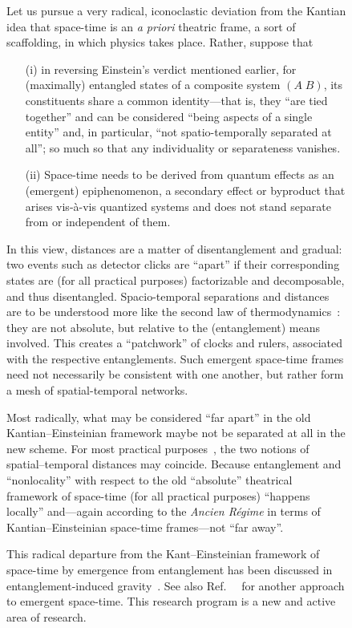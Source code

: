 \documentclass[entropy,article,accept,oneauthor,pdftex]{Definitions/mdpi}
\begin{document}
\begin{figure}[H]
Let us pursue a very radical, iconoclastic deviation from the Kantian idea
that space-time is an {\it a priori} theatric frame, a sort of scaffolding,
in which physics takes place. Rather, suppose that
\begin{itemize}
\item[(i)]
in reversing Einstein's verdict mentioned earlier,
for (maximally) entangled states of a composite system $(A\;B)$,
its constituents share a common identity---that is,
they ``are tied together'' and can be considered ``being aspects of a single entity'' and,
in particular, ``not spatio-temporally separated at all'';
so much so that any individuality or separateness vanishes.

\item[(ii)]
Space-time needs to be derived from quantum effects as an (emergent) epiphenomenon,
a secondary effect or byproduct that arises vis-\`a-vis quantized systems
and does not stand separate from or independent of them.
\end{itemize}

In this view, distances are a matter of disentanglement and gradual:
two events such as detector clicks are ``apart'' if their corresponding states
are (for all practical purposes) factorizable and decomposable, and thus disentangled.
Spacio-temporal separations and distances are to be understood more like the second law
of thermodynamics~\cite{Myrvold2011237}: they are not absolute, but relative
to the (entanglement) means involved.
This creates a ``patchwork'' of clocks and rulers, associated with the respective entanglements.
Such emergent space-time frames need not necessarily be consistent with one another,
but rather form a mesh of spatial-temporal networks.

Most radically, what may be considered ``far apart'' in the old Kantian--Einsteinian
framework maybe not be separated at all in the new scheme.
For most practical purposes~\cite{bell:a1,bell-a},
the two notions of spatial--temporal distances may coincide.
Because entanglement and ``nonlocality'' with respect to the old ``absolute''
theatrical framework of space-time (for all practical purposes) ``happens locally'' and---again according
to the {\it Ancien R\'egime} in terms of Kantian--Einsteinian space-time frames---not ``far away''.


This radical departure from the Kant--Einsteinian framework of space-time by
emergence from entanglement has been discussed in entanglement-induced
gravity~\cite{VanRaamsdonk2010,VANRAAMSDONK2010b,Faulkner2014,Swingle:2014uza,Jacobson2016,Cao2017,Swingle2018,Musser2018}.
See also Ref.~~\cite{Knuth-Bahreyni} for another approach to emergent space-time.
This research program is a new and active area of research.


\end{figure}
\end{document}
